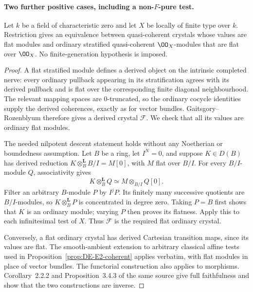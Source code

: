 \paragraph{Two further positive cases, including a non-$F$-pure test.}

\begin{proposition}\label{prop:DE-E2-flat-charzero}
Let $k$ be a field of characteristic zero and let $X$ be locally of finite type over $k$.  Restriction gives an equivalence between quasi-coherent crystals whose values are flat modules and ordinary stratified quasi-coherent $\OO_X$-modules that are flat over $\OO_X$.  No finite-generation hypothesis is imposed.
\end{proposition}
\begin{proof}
A flat stratified module defines a derived object on the intrinsic completed nerve: every ordinary pullback appearing in its stratification agrees with its derived pullback and is flat over the corresponding finite diagonal neighbourhood.  The relevant mapping spaces are $0$-truncated, so the ordinary cocycle identities supply the derived coherences, exactly as for vector bundles.  Gaitsgory--Rozenblyum \cite[Proposition~3.4.3]{GaitsgoryRozenblyum2014} therefore gives a derived crystal $\mathcal F$.  We check that all its values are ordinary flat modules.

The needed nilpotent descent statement holds without any Noetherian or boundedness assumption.  Let $B$ be a ring, let $I^N=0$, and suppose $K\in D(B)$ has derived reduction $K\otimes_B^{\mathbf L}B/I=M[0]$, with $M$ flat over $B/I$.  For every $B/I$-module $Q$, associativity gives
\[
 K\otimes_B^{\mathbf L}Q\simeq M\otimes_{B/I}Q[0].
\]
Filter an arbitrary $B$-module $P$ by $I^jP$.  Its finitely many successive quotients are $B/I$-modules, so $K\otimes_B^{\mathbf L}P$ is concentrated in degree zero.  Taking $P=B$ first shows that $K$ is an ordinary module; varying $P$ then proves its flatness.  Apply this to each infinitesimal test of $X$.  Thus $\mathcal F$ is the required flat ordinary crystal.

Conversely, a flat ordinary crystal has derived Cartesian transition maps, since its values are flat.  The smooth-ambient extension to arbitrary classical affine tests used in Proposition~\ref{prop:DE-E2-coherent} applies verbatim, with flat modules in place of vector bundles.  The functorial construction also applies to morphisms.  Corollary~2.2.2 and Proposition~3.4.3 of the same source give full faithfulness and show that the two constructions are inverse.
\end{proof}

